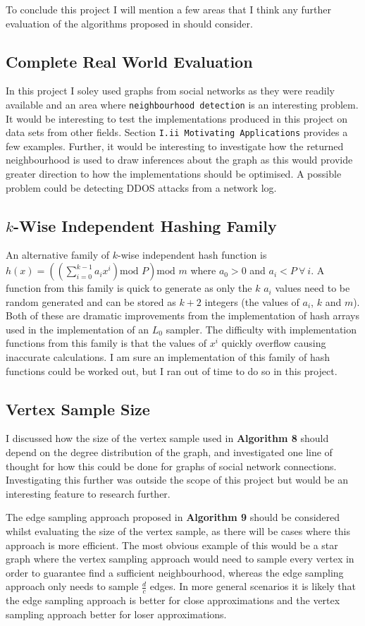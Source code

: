 \documentclass[11pt,twoside,a4paper]{report}
\begin{document}
To conclude this project I will mention a few areas that I think any further evaluation of the algorithms proposed in \cite{orig} should consider.

\subsection*{Complete Real World Evaluation}
In this project I soley used graphs from social networks as they were readily available and an area where \texttt{neighbourhood detection} is an interesting problem. It would be interesting to test the implementations produced in this project on data sets from other fields. Section \texttt{I.ii Motivating Applications} provides a few examples. Further, it would be interesting to investigate how the returned neighbourhood is used to draw inferences about the graph as this would provide greater direction to how the implementations should be optimised. A possible problem could be detecting DDOS attacks from a network log.

\subsection*{$k$-Wise Independent Hashing Family}
An alternative family of $k$-wise independent hash function is ${\displaystyle h(x)=\left(\left(\sum_{i=0}^{k-1}a_ix^i\right)\text{mod }P\right)\text{mod }m}$ where $a_0>0$ and $a_i<P\ \forall\ i$. A function from this family is quick to generate as only the $k$ $a_i$ values need to be random generated and can be stored as $k+2$ integers (the values of $a_i$, $k$ and $m$). Both of these are dramatic improvements from the implementation of hash arrays used in the implementation of an $L_0$ sampler. The difficulty with implementation functions from this family is that the values of $x^i$ quickly overflow causing inaccurate calculations. I am sure an implementation of this family of hash functions could be worked out, but I ran out of time to do so in this project.

\subsection*{Vertex Sample Size}
I discussed how the size of the vertex sample used in \textbf{Algorithm 8} should depend on the degree distribution of the graph, and investigated one line of thought for how this could be done for graphs of social network connections. Investigating this further was outside the scope of this project but would be an interesting feature to research further.
\par The edge sampling approach proposed in \textbf{Algorithm 9} should be considered whilst evaluating the size of the vertex sample, as there will be cases where this approach is more efficient. The most obvious example of this would be a star graph where the vertex sampling approach would need to sample every vertex in order to guarantee find a sufficient neighbourhood, whereas the edge sampling approach only needs to sample $\frac{d}c$ edges. In more general scenarios it is likely that the edge sampling approach is better for close approximations and the vertex sampling approach better for loser approximations.
\end{document}
